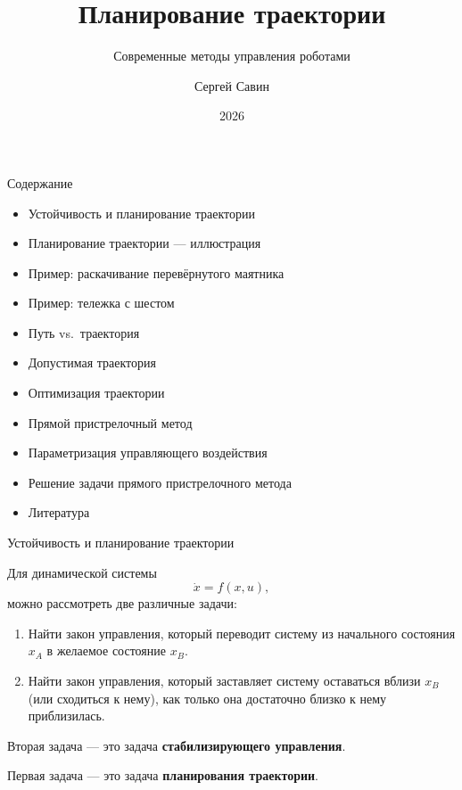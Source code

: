 \documentclass{beamer}
\subtitle{Современные методы управления роботами}
\author{Сергей Савин}
\date{2026}
\title{Планирование траектории}
\begin{document}
	\maketitle
	
	
	\begin{frame}{Содержание}
		\begin{itemize}
			\item Устойчивость и планирование траектории
			\item Планирование траектории — иллюстрация
			\item Пример: раскачивание перевёрнутого маятника
			\item Пример: тележка с шестом
			\item Путь vs.\ траектория
			\item Допустимая траектория
			\item Оптимизация траектории
			\item Прямой пристрелочный метод
			\item Параметризация управляющего воздействия
			\item Решение задачи прямого пристрелочного метода
			\item Литература
		\end{itemize}
	\end{frame}
	
	
	\begin{frame}{Устойчивость и планирование траектории}
		\begin{flushleft}
			
			Для динамической системы
			\[
			\dot{x}=f(x,u),
			\]
			можно рассмотреть две различные задачи:
			
			\begin{enumerate}
				\item Найти закон управления, который переводит систему
				из начального состояния $x_A$ в желаемое состояние $x_B$.
				
				\item Найти закон управления, который заставляет систему
				оставаться вблизи $x_B$ (или сходиться к нему), как только она
				достаточно близко к нему приблизилась.
			\end{enumerate}
			
			\vspace{0.5em}
			
			Вторая задача — это задача
			\textbf{стабилизирующего управления}.
			
			Первая задача — это задача
			\textbf{планирования траектории}.
			
		\end{flushleft}
	\end{frame}
	
\end{document}
